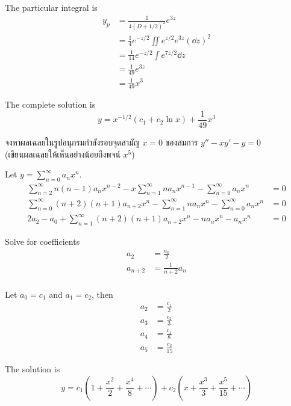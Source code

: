 \documentclass[12pt,final]{novelette} %
\begin{document}
\begin{question}[resume]
    The particular integral is
    \begin{align*}
        y_p & = \frac{1}{4(D + 1/2)^2} e^{3z}                    \\
            & = \frac14 e^{-z/2} \iint e^{z/2} e^{3z} (\dd{z})^2 \\
            & = \frac1{14} e^{-z/2} \int e^{7z/2} \dd{z}         \\
            & = \frac1{49} e^{3z}                                \\
            & = \frac1{49} x^3
    \end{align*}

    The complete solution is
    $$
        \boxed{y = x^{-1/2} (c_1 + c_2 \ln x) + \frac1{49} x^3}
    $$


    \item {}
    จงหาผลเฉลยในรูปอนุกรมกำลังรอบจุดสามัญ $x=0$ ของสมการ $y'' - xy' - y = 0$ \\
    (เขียนผลเฉลยให้เห็นอย่างน้อยถึงพจน์ $x^5$) 

    \bigskip
    Let $ \displaystyle y = \sum_{n=0}^\infty a_n x^n $.
    \begin{align*}
        \sum_{n=2}^\infty n(n-1) a_n x^{n-2} - x \sum_{n=1}^\infty n a_n x^{n-1} - \sum_{n=0}^\infty a_n x^n & = 0 \\
        \sum_{n=0}^\infty (n+2)(n+1) a_{n+2} x^n - \sum_{n=1}^\infty n a_n x^n - \sum_{n=0}^\infty a_n x^n   & = 0 \\
        2 a_2 - a_0 + \sum_{n=1}^\infty (n+2)(n+1) a_{n+2} x^n - n a_n x^n - a_n x^n                         & = 0
    \end{align*}

    Solve for coefficients
    \begin{align*}
        a_2     & = \frac{a_0}{2}     \\
        a_{n+2} & = \frac{1}{n+2} a_n \\
    \end{align*}

    Let $a_0 = c_1$ and $a_1 = c_2$, then
    \begin{align*}
        a_2 & = \frac{c_1}{2}  \\
        a_3 & = \frac{c_2}{3}  \\
        a_4 & = \frac{c_1}{8}  \\
        a_5 & = \frac{c_2}{15}
    \end{align*}

    The solution is
    $$
        \boxed{y = c_1\left(1 + \frac{x^2}{2} + \frac{x^4}{8} + \cdots\right) + c_2\left(x + \frac{x^3}{3} + \frac{x^5}{15} + \cdots\right)}
    $$
\end{question}
\end{document}
